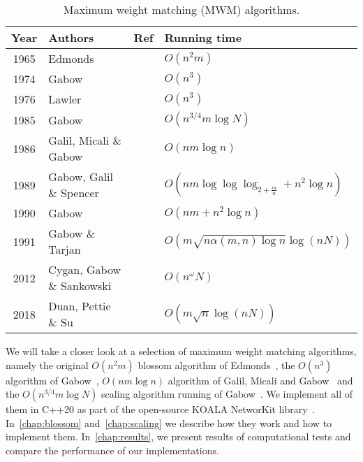 \begin{table}
\centering
\begin{tabular}{clcl}
\toprule
\textbf{Year} & \textbf{Authors} & \textbf{Ref}                 & \textbf{Running time} \\
\midrule
1965 & Edmonds                   &\cite{edmonds1965maximum}     & $O(n^2m)$ \\
1974 & Gabow                     &\cite{gabow1974implementation}& $O(n^3)$ \\
1976 & Lawler                    &\cite{lawler2001combinatorial}& $O(n^3)$ \\
1985 & Gabow                     &\cite{gabow1985scaling}       & $O(n^{3/4}m \log N)$ \\
1986 & Galil, Micali \& Gabow    &\cite{galil1986ev}            & $O(nm \log n)$ \\
1989 & Gabow, Galil \& Spencer   &\cite{gabow1989faster}        & $O(nm \log \log \log_{2 + \frac{m}{n}} + n^2\log n)$ \\
1990 & Gabow                     &\cite{gabow1990data}          & $O(nm + n^2 \log n)$ \\
1991 & Gabow \& Tarjan           &\cite{gabow1991faster}        & $O(m \sqrt{n \alpha(m, n) \log n} \log (nN))$ \\
2012 & Cygan, Gabow \& Sankowski &\cite{cygan2015algorithmic}   & $O(n^\omega N)$ \\
2018 & Duan, Pettie \& Su        &\cite{duan2018scaling}        & $O(m \sqrt{n} \log(nN))$ \\
\bottomrule
\end{tabular}
\caption{Maximum weight matching (\textsc{MWM}) algorithms.}\label{tab:mwm_alogrithms}
\end{table}


We will take a closer look at a selection of maximum weight matching algorithms, namely the original $O(n^2m)$ blossom algorithm of Edmonds~\cite{edmonds1965maximum}, the $O(n^3)$ algorithm of Gabow~\cite{gabow1974implementation}, $O(nm \log n)$ algorithm of Galil, Micali and Gabow~\cite{galil1986ev} and the $O(n^{3/4}m \log N)$ scaling algorithm running of Gabow~\cite{gabow1985scaling}. We implement all of them in C++20 as part of the open-source KOALA NetworKit library~\cite{koala-networkit}. In~\autoref{chap:blossom} and~\autoref{chap:scaling} we describe how they work and how to implement them. In~\autoref{chap:results}, we present results of computational tests and compare the performance of our implementations.
